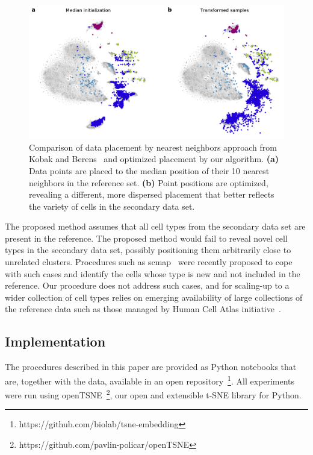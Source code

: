 \documentclass[runningheads]{llncs}
\begin{document}
\begin{figure}[htbp]
\includegraphics[width=\textwidth]{figures/optimization_retina.pdf}
\caption{Comparison of data placement by nearest neighbors approach from Kobak and Berens~\cite{art_of_using_tsne} and optimized placement by our algorithm. {\bf (a)} Data points are placed to the median position of their 10 nearest neighbors in the reference set. {\bf (b)} Point positions are optimized, revealing a different, more dispersed placement that better reflects the variety of cells in the secondary data set.}
\label{fig:optimization}
\end{figure}

The proposed method assumes that all cell types from the secondary data set are present in the reference. The proposed method would fail to reveal novel cell types in the secondary data set, possibly positioning them arbitrarily close to unrelated clusters. Procedures such as scmap~\cite{scmap} were recently proposed to cope with such cases and identify the cells whose type is new and not included in the reference. Our procedure does not address such cases, and for scaling-up to a wider collection of cell types relies on emerging availability of large collections of the reference data such as those managed by Human Cell Atlas initiative~\cite{hca}. 

\subsection{Implementation\label{sec:implementation}}

The procedures described in this paper are provided as Python notebooks that are, together with the data, available in an open repository~\footnote{https://github.com/biolab/tsne-embedding}. All experiments were run using openTSNE~\footnote{https://github.com/pavlin-policar/openTSNE}, our open and extensible t-SNE library for Python.
\end{document}
